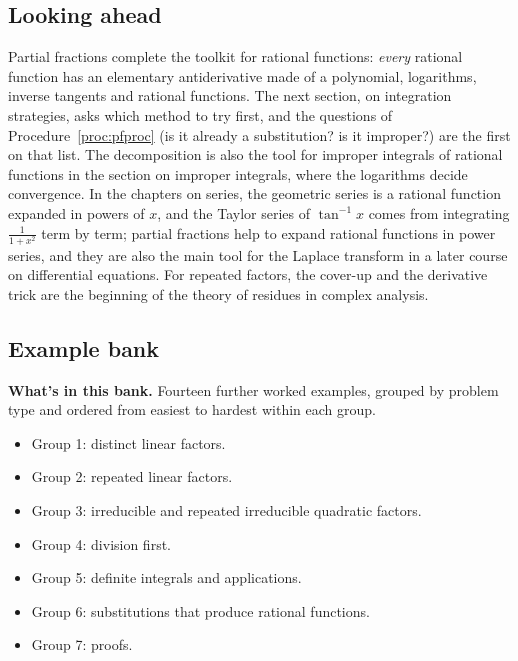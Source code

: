 \documentclass[11pt]{article}
\begin{document}
\subsection*{Looking ahead}

Partial fractions complete the toolkit for rational functions: \emph{every} rational function has an elementary antiderivative made of a polynomial, logarithms, inverse tangents and rational functions. The next section, on integration strategies, asks which method to try first, and the questions of Procedure~\ref{proc:pfproc} (is it already a substitution? is it improper?) are the first on that list. The decomposition is also the tool for improper integrals of rational functions in the section on improper integrals, where the logarithms decide convergence. In the chapters on series, the geometric series is a rational function expanded in powers of $x$, and the Taylor series of $\tan^{-1}x$ comes from integrating $\frac1{1+x^2}$ term by term; partial fractions help to expand rational functions in power series, and they are also the main tool for the Laplace transform in a later course on differential equations. For repeated factors, the cover-up and the derivative trick are the beginning of the theory of residues in complex analysis.

\subsection*{Example bank}

\textbf{What's in this bank.} Fourteen further worked examples, grouped by problem type and ordered from easiest to hardest within each group.
\begin{itemize}[nosep]
  \item Group 1: distinct linear factors.
  \item Group 2: repeated linear factors.
  \item Group 3: irreducible and repeated irreducible quadratic factors.
  \item Group 4: division first.
  \item Group 5: definite integrals and applications.
  \item Group 6: substitutions that produce rational functions.
  \item Group 7: proofs.
\end{itemize}
\end{document}
